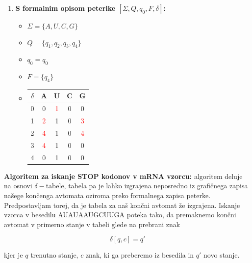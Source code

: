 \documentclass{article}
\begin{document}
\begin{enumerate}
\begin{enumerate}
\begin{center}
			\end{center}

			\item \textbf{S formalnim opisom peterike $\left[ \Sigma, Q, q_0, F, \delta \right]$:}

				\begin{itemize}
					\item $\Sigma = \{ A, U, C, G \}$
					\item $Q = \{ q_1, q_2, q_3, q_4 \}$
					\item $q_0 = q_0$
					\item $F = \{ q_4 \}$
					\item \begin{tabular}{|c||c|c|c|c|}
							\hline
							$\delta$ & A & U & C & G \\
							\hline \hline
							0 & 0 & \textcolor{red}{1} & 0 & 0 \\
							\hline
							1 & \textcolor{red}{2} & 1 & 0 & \textcolor{red}{3} \\
							\hline
							2 & \textcolor{red}{4} & 1 & 0 & \textcolor{red}{4} \\
							\hline
							3 & \textcolor{red}{4} & 1 & 0 & 0 \\
							\hline
							4 & 0 & 1 & 0 & 0 \\
							\hline
						\end{tabular}
				\end{itemize}
		\end{enumerate}

		\textbf{Algoritem za iskanje STOP kodonov v mRNA vzorcu:} algoritem deluje na osnovi
		$\delta-$tabele, tabela pa je lahko izgrajena neposredno iz grafičnega zapisa našege
		končenga avtomata oziroma preko formalnega zapisa peterke. Predpostavljam torej, da 
		je tabela za naš končni avtomat že izgrajena. Iskanje vzorca v besedilu AUAUAAUGCUUGA 
		poteka tako, da premaknemo končni avtomat v primerno stanje v tabeli glede na prebrani
		znak

		\begin{equation}
			\delta[q, c] = q'
		\end{equation}

		kjer je $q$ trenutno stanje, $c$ znak, ki ga preberemo iz besedila in $q'$ novo stanje.
		

\end{enumerate}
\end{document}
